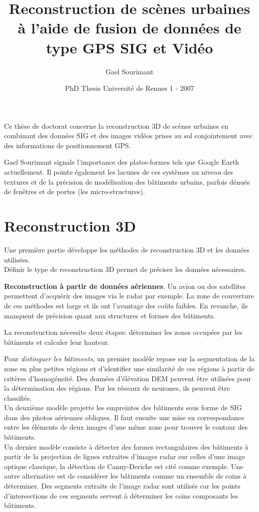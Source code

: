 \documentclass[11pt]{article}
\title{Reconstruction de scènes urbaines à l’aide de fusion de données de type GPS  SIG et Vidéo}
\author{Gael Sourimant}
\date{PhD Thesis Université de Rennes 1 - 2007}
\begin{document}
\maketitle

Ce thèse de doctorat concerne la reconstruction 3D de scènes urbaines en combinant des données SIG et des images vidéos prises au sol conjointement avec des informations de positionnement GPS.

Gael Sourimant signale l'importance des plates-formes tels que Google Earth actuellement. Il pointe également les lacunes de ces systèmes au niveau des textures et de la précision de modélisation des bâtiments urbains, parfois dénués de fenêtres et de portes (les micro-structures).

\section{Reconstruction 3D}

Une première partie développe les méthodes de reconstruction 3D et les données utilisées.\\
Définir le type de reconstruction 3D permet de préciser les données nécessaires.

\textbf{Reconstruction à partir de données aériennes}. Un avion ou des satellites permettent d'acquérir des images via le radar par exemple. La zone de couverture de ces méthodes est large et ils ont l'avantage des coûts faibles. En revanche, ils manquent de précision quant aux structures et formes des bâtiments. 

La reconstruction nécessite deux étapes: déterminer les zones occupées par les bâtiments et calculer leur hauteur. 

Pour \textit{distinguer les bâtiments}, un premier modèle repose sur la segmentation de la zone en plus petites régions et d'identifier une similarité de ces régions à partir de critères d'homogéneité. Des données d'élévation DEM peuvent être utilisées pour la détermination des régions. Par les réseaux de neurones, ils peuvent être classifiés. \\
Un deuxième modèle projette les empreintes des bâtiments sous forme de SIG dans des photos aériennes obliques. Il faut ensuite une mise en correspondance entre les éléments de deux images d'une même zone pour trouver le contour des bâtiments. \\
Un dernier modèle consiste à détecter des formes rectangulaires des bâtiments à partir de la projection de lignes extraites d'images radar sur celles d'une image optique classique, la détection de Canny-Deriche est cité comme exemple. Une autre alternative est de considérer les bâtiments comme un ensemble de coins à déterminer. Des segments extraits de l'image radar sont utilisés car les points d'intersections de ces segments servent à déterminer les coins composants les bâtiments.
\end{document}
